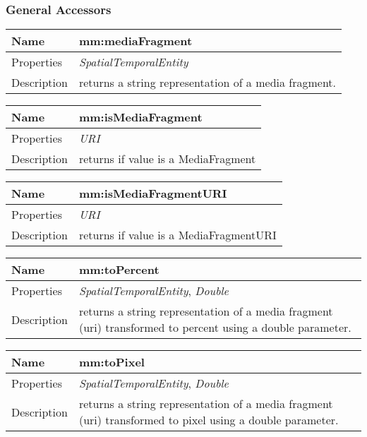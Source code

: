 \subsubsection*{General Accessors}
\begin{tabular}{|p{3cm}|p{10cm}|}
\hline Name & mm:mediaFragment\\
\hline Properties & \textit{SpatialTemporalEntity} \\
\hline Description & returns a string representation of a media fragment.\\
\hline
\end{tabular}
\vspace{0.3cm}
\newline
\begin{tabular}{|p{3cm}|p{10cm}|}
\hline Name & mm:isMediaFragment\\
\hline Properties & \textit{URI} \\
\hline Description & returns if value is a MediaFragment\\
\hline
\end{tabular}
\vspace{0.3cm}
\newline
\begin{tabular}{|p{3cm}|p{10cm}|}
\hline Name & mm:isMediaFragmentURI\\
\hline Properties & \textit{URI} \\
\hline Description & returns if value is a MediaFragmentURI\\
\hline
\end{tabular}
\vspace{0.3cm}
\newline
\begin{tabular}{|p{3cm}|p{10cm}|}
\hline Name & mm:toPercent\\
\hline Properties & \textit{SpatialTemporalEntity}, \textit{Double} \\
\hline Description & returns a string representation of a media fragment (uri) transformed to percent using a double parameter.\\
\hline
\end{tabular}
\vspace{0.3cm}
\newline
\begin{tabular}{|p{3cm}|p{10cm}|}
\hline Name & mm:toPixel\\
\hline Properties & \textit{SpatialTemporalEntity}, \textit{Double} \\
\hline Description & returns a string representation of a media fragment (uri) transformed to pixel using a double parameter.\\
\hline
\end{tabular}
\vspace{0.3cm}
\newline
